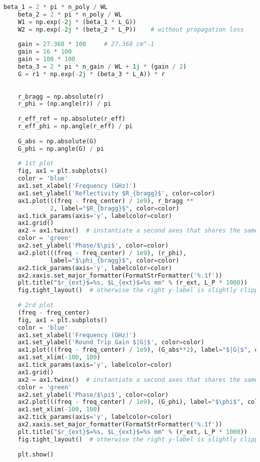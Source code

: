 \begin{lstlisting}[language=Python, basicstyle=\tiny]
    beta_1 = 2 * pi * n_poly / WL
    beta_2 = 2 * pi * n_poly / WL
    W1 = np.exp(-2j * (beta_1 * L_G))
    W2 = np.exp(-2j * (beta_2 * L_P))    # without propagation loss
    
    gain = 27.368 * 100     # 27.368 cm^-1
    gain = 16 * 100
    gain = 100 * 100
    beta_3 = 2 * pi * n_gain / WL + 1j * (gain / 2)
    G = r1 * np.exp(-2j * (beta_3 * L_A)) * r
    
    
    r_bragg = np.absolute(r)
    r_phi = (np.angle(r)) / pi
    
    r_eff_ref = np.absolute(r_eff)
    r_eff_phi = np.angle(r_eff) / pi
    
    G_abs = np.absolute(G)
    G_phi = np.angle(G) / pi
    
    # 1st plot
    fig, ax1 = plt.subplots()
    color = 'blue'
    ax1.set_xlabel('Frequency (GHz)')
    ax1.set_ylabel('Reflectivity $R_{bragg}$', color=color)
    ax1.plot(((freq - freq_center) / 1e9), r_bragg **
             2, label="$R_{bragg}$", color=color)
    ax1.tick_params(axis='y', labelcolor=color)
    ax1.grid()
    ax2 = ax1.twinx()  # instantiate a second axes that shares the same x-axis
    color = 'green'
    ax2.set_ylabel('Phase/$\pi$', color=color)
    ax2.plot(((freq - freq_center) / 1e9), (r_phi),
             label="$\phi_{bragg}$", color=color)
    ax2.tick_params(axis='y', labelcolor=color)
    ax2.xaxis.set_major_formatter(FormatStrFormatter('%.1f'))
    plt.title("$r_{ext}$=%s, $L_{ext}$=%s mm" % (r_ext, L_P * 1000))
    fig.tight_layout()  # otherwise the right y-label is slightly clipped
    
    # 2rd plot
    (freq - freq_center)
    fig, ax1 = plt.subplots()
    color = 'blue'
    ax1.set_xlabel('Frequency (GHz)')
    ax1.set_ylabel('Round Trip Gain $|G|$', color=color)
    ax1.plot(((freq - freq_center) / 1e9), (G_abs**2), label="$|G|$", color=color)
    ax1.set_xlim(-100, 100)
    ax1.tick_params(axis='y', labelcolor=color)
    ax1.grid()
    ax2 = ax1.twinx()  # instantiate a second axes that shares the same x-axis
    color = 'green'
    ax2.set_ylabel('Phase/$\pi$', color=color)
    ax2.plot(((freq - freq_center) / 1e9), (G_phi), label="$\phi$", color=color)
    ax1.set_xlim(-100, 100)
    ax2.tick_params(axis='y', labelcolor=color)
    ax2.xaxis.set_major_formatter(FormatStrFormatter('%.1f'))
    plt.title("$r_{ext}$=%s, $L_{ext}$=%s mm" % (r_ext, L_P * 1000))
    fig.tight_layout()  # otherwise the right y-label is slightly clipped
    
    plt.show()
\end{lstlisting}
    